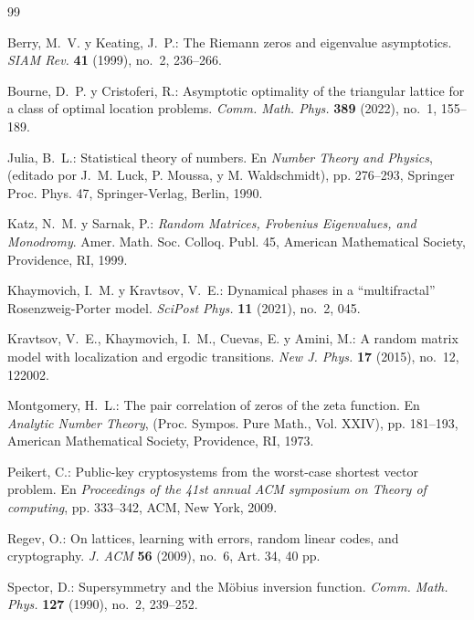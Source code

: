 \documentclass{article}
\numberwithin{equation}{section}
\theoremstyle{plain}
\theoremstyle{definition}
\begin{document}
\begin{thebibliography}{99}

Berry, M.~V. y Keating, J.~P.: 
The Riemann zeros and eigenvalue asymptotics. 
\emph{SIAM Rev.} \textbf{41} (1999), no.~2, 236--266.

Bourne, D.~P. y Cristoferi, R.: 
Asymptotic optimality of the triangular lattice for a class of optimal location problems. 
\emph{Comm. Math. Phys.} \textbf{389} (2022), no.~1, 155--189.

Julia, B.~L.: 
Statistical theory of numbers. 
En \emph{Number Theory and Physics}, (editado por J.~M. Luck, P. Moussa, y M. Waldschmidt), 
pp. 276--293, Springer Proc. Phys. 47, Springer-Verlag, Berlin, 1990.

Katz, N.~M. y Sarnak, P.: 
\emph{Random Matrices, Frobenius Eigenvalues, and Monodromy}. 
Amer. Math. Soc. Colloq. Publ. 45, American Mathematical Society, Providence, RI, 1999.

Khaymovich, I.~M. y Kravtsov, V.~E.: 
Dynamical phases in a ``multifractal'' Rosenzweig-Porter model. 
\emph{SciPost Phys.} \textbf{11} (2021), no.~2, 045.

Kravtsov, V.~E., Khaymovich, I.~M., Cuevas, E. y Amini, M.: 
A random matrix model with localization and ergodic transitions. 
\emph{New J. Phys.} \textbf{17} (2015), no.~12, 122002.

Montgomery, H.~L.: 
The pair correlation of zeros of the zeta function. 
En \emph{Analytic Number Theory}, (Proc. Sympos. Pure Math., Vol. XXIV), 
pp. 181--193, American Mathematical Society, Providence, RI, 1973.

Peikert, C.: 
Public-key cryptosystems from the worst-case shortest vector problem. 
En \emph{Proceedings of the 41st annual ACM symposium on Theory of computing}, 
pp. 333--342, ACM, New York, 2009.

Regev, O.: 
On lattices, learning with errors, random linear codes, and cryptography. 
\emph{J. ACM} \textbf{56} (2009), no.~6, Art. 34, 40 pp.

Spector, D.: 
Supersymmetry and the M\"{o}bius inversion function. 
\emph{Comm. Math. Phys.} \textbf{127} (1990), no.~2, 239--252.


\end{thebibliography}
\end{document}
